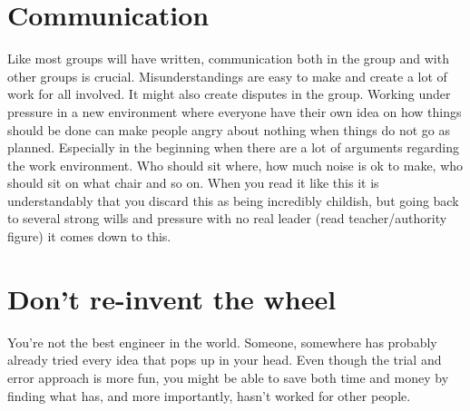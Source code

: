 \documentclass[12pt,a4paper]{article}
\begin{document}
\section{Communication}
Like most groups will have written, communication both in the group and with other groups is crucial. Misunderstandings are easy to make and create a lot of work for all involved. It might also create disputes in the group. Working under pressure in a new environment where everyone have their own idea on how things should be done can make people angry about nothing when things do not go as planned. Especially in the beginning when there are a lot of arguments regarding the work environment. Who should sit where, how much noise is ok to make, who should sit on what chair and so on. When you read it like this it is understandably that you discard this as being incredibly childish, but going back to several strong wills and pressure with no real leader (read teacher/authority figure) it comes down to this. 

\section{Don't re-invent the wheel}
You're not the best engineer in the world. Someone, somewhere has probably already tried every idea that pops up in your head. Even though the trial and error approach is more fun, you might be able to save both time and money by finding what has, and more importantly, hasn't worked for other people.
\end{document}
